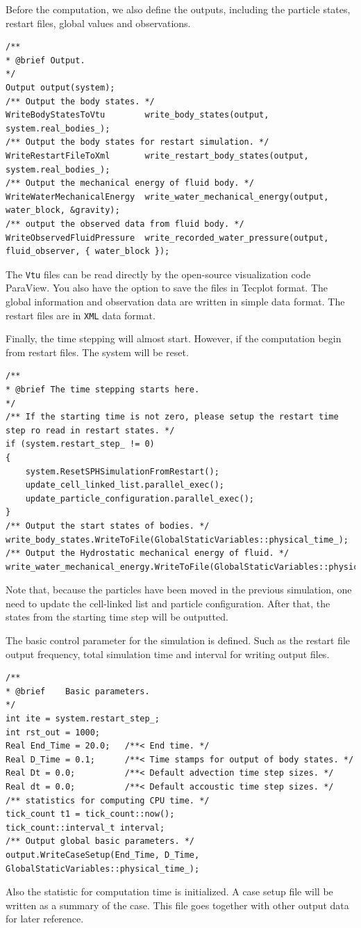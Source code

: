\documentclass[12pt, a4paper,onecolumn]{article}
\begin{document}
Before the computation, we also define the outputs, 
including the particle states, restart files, global values and observations.
%
\begin{lstlisting}[basicstyle=\ttfamily\footnotesize]
	/**
* @brief Output.
*/
Output output(system);
/** Output the body states. */
WriteBodyStatesToVtu 		write_body_states(output, system.real_bodies_);
/** Output the body states for restart simulation. */
WriteRestartFileToXml		write_restart_body_states(output, system.real_bodies_);
/** Output the mechanical energy of fluid body. */
WriteWaterMechanicalEnergy 	write_water_mechanical_energy(output, water_block, &gravity);
/** output the observed data from fluid body. */
WriteObservedFluidPressure	write_recorded_water_pressure(output, fluid_observer, { water_block });\end{lstlisting}
%
The \texttt{Vtu} files can be read directly by the open-source visualization code ParaView.
You also have the option to save the files in Tecplot format.
The global information and observation data are written in simple data format. 
The restart files are in \texttt{XML} data format.

Finally, the time stepping will almost start. 
However, if the computation begin from restart files. 
The system will be reset.  
%
\begin{lstlisting}[basicstyle=\ttfamily\footnotesize]
	/**
* @brief The time stepping starts here.
*/
/** If the starting time is not zero, please setup the restart time step ro read in restart states. */
if (system.restart_step_ != 0)
{
	system.ResetSPHSimulationFromRestart();
	update_cell_linked_list.parallel_exec();
	update_particle_configuration.parallel_exec();
}
/** Output the start states of bodies. */
write_body_states.WriteToFile(GlobalStaticVariables::physical_time_);
/** Output the Hydrostatic mechanical energy of fluid. */
write_water_mechanical_energy.WriteToFile(GlobalStaticVariables::physical_time_);
\end{lstlisting}
%
Note that, because the particles have been moved in the previous simulation, 
one need to update the cell-linked list and particle configuration. 
After that, the states from the starting time step will be outputted. 

The basic control parameter for the simulation is defined.
Such as the restart file output frequency, total simulation time 
and interval for writing output files. 
%
\begin{lstlisting}[basicstyle=\ttfamily\footnotesize]
	/**
* @brief 	Basic parameters.
*/
int ite = system.restart_step_;
int rst_out = 1000;
Real End_Time = 20.0; 	/**< End time. */
Real D_Time = 0.1;		/**< Time stamps for output of body states. */
Real Dt = 0.0;			/**< Default advection time step sizes. */
Real dt = 0.0; 			/**< Default accoustic time step sizes. */
/** statistics for computing CPU time. */
tick_count t1 = tick_count::now();
tick_count::interval_t interval;
/** Output global basic parameters. */
output.WriteCaseSetup(End_Time, D_Time, GlobalStaticVariables::physical_time_);
\end{lstlisting}
%
Also the statistic for computation time is initialized.
A case setup file will be written as a summary of the case. This file goes together with other output data for later reference.
\end{document}
